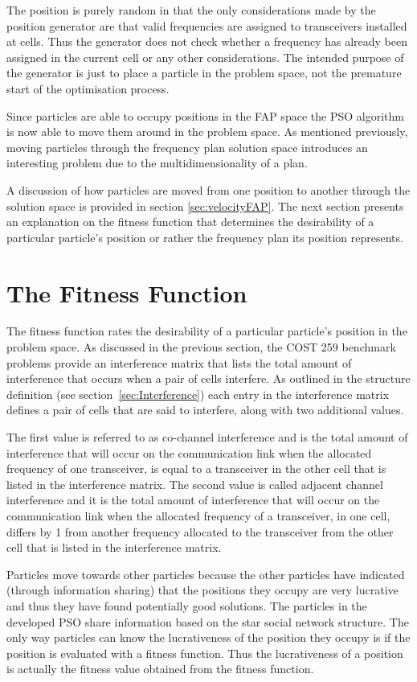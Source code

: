 The position is purely random in that the only considerations made by the position generator are that valid frequencies are assigned to transceivers installed at cells. Thus the generator does not check whether a frequency has already been assigned in the current cell or any other considerations. The intended purpose of the generator is just to place a particle in the problem space, not the premature start of the optimisation process.

Since particles are able to occupy positions in the \gls{FAP} space the \gls{PSO} algorithm is now able to move them around in the problem space. As mentioned previously, moving particles through the frequency plan solution space introduces an interesting problem due to the multidimensionality of a plan. 

A discussion of how particles are moved from one position to another through the solution space is provided in section \ref{sec:velocityFAP}. The next section presents an explanation on the fitness function that determines the desirability of a particular particle's position or rather the frequency plan its position represents.
\section{The Fitness Function}
The fitness function rates the desirability of a particular particle's position in the problem space. As discussed in the previous section, the COST 259 benchmark problems provide an interference matrix that lists the total amount of interference that occurs when a pair of cells interfere. As outlined in the structure definition (see section~\ref{sec:Interference}) each entry in the interference matrix defines a pair of cells that are said to interfere, along with two additional values. 

The first value is referred to as co-channel interference and is the total amount of interference that will occur on the communication link when the allocated frequency of one transceiver, is equal to a transceiver in the other cell that is listed in the interference matrix. The second value is called adjacent channel interference and it is the total amount of interference that will occur on the communication link when the allocated frequency of a transceiver, in one cell, differs by 1 from another frequency allocated to the transceiver from the other cell that is listed in the interference matrix.

Particles move towards other particles because the other particles have indicated (through information sharing) that the positions they occupy are very lucrative and thus they have found potentially good solutions. The particles in the developed \gls{PSO} share information based on the star social network structure. The only way particles can know the lucrativeness of the position they occupy is if the position is evaluated with a fitness function. Thus the lucrativeness of a position is actually the fitness value obtained from the fitness function.

